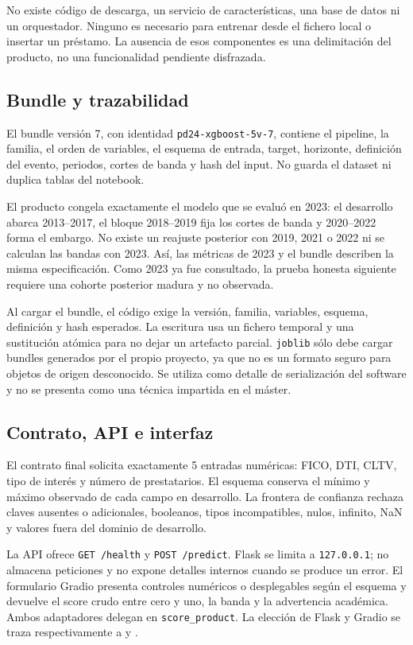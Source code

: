 \documentclass[10pt,a4paper]{article}
\newcommand{\SelectedK}{5}
\newcommand{\SelectedFeatures}{FICO, DTI, CLTV, tipo de interés y número de prestatarios}
\newcommand{\DevelopmentPeriod}{2013--2017}
\newcommand{\BandPeriod}{2018--2019}
\newcommand{\BundleVersion}{7}
\newcommand{\ModelVersion}{\texttt{pd24-xgboost-5v-7}}
\begin{document}
No existe código de descarga, un servicio de características, una base de datos
ni un orquestador. Ninguno es necesario para entrenar desde el fichero local o
insertar un préstamo. La ausencia de esos componentes es una delimitación del
producto, no una funcionalidad pendiente disfrazada.

\subsection{Bundle y trazabilidad}

El bundle versión \BundleVersion{}, con identidad \ModelVersion{}, contiene el pipeline, la
familia, el orden de variables, el esquema de entrada, target, horizonte,
definición del evento, periodos, cortes de banda y hash del input. No guarda el
dataset ni duplica tablas del notebook.

El producto congela exactamente el modelo que se evaluó en 2023: el desarrollo
abarca \DevelopmentPeriod{}, el bloque \BandPeriod{} fija los cortes de banda y
2020--2022 forma el embargo. No existe un reajuste posterior con 2019,
2021 o 2022 ni se calculan las bandas con 2023. Así, las métricas de 2023 y el
bundle describen la misma especificación. Como 2023 ya fue consultado, la prueba
honesta siguiente requiere una cohorte posterior madura y no observada.

Al cargar el bundle, el código exige la versión, familia, variables, esquema,
definición y hash esperados. La escritura usa un fichero temporal y una
sustitución atómica para no dejar un artefacto parcial. \texttt{joblib} sólo debe
cargar bundles generados por el propio proyecto, ya que no es un formato seguro
para objetos de origen desconocido. Se utiliza como detalle de serialización del
software y no se presenta como una técnica impartida en el máster.

\subsection{Contrato, API e interfaz}

El contrato final solicita exactamente \SelectedK{} entradas numéricas:
\SelectedFeatures{}. El esquema conserva el mínimo y máximo observado de cada
campo en desarrollo. La frontera de confianza rechaza claves
ausentes o adicionales, booleanos, tipos incompatibles, nulos, infinito, NaN y
valores fuera del dominio de desarrollo.

La API ofrece \texttt{GET /health} y \texttt{POST /predict}. Flask se limita a
\texttt{127.0.0.1}; no almacena peticiones y no expone detalles internos cuando
se produce un error. El formulario Gradio presenta controles numéricos o
desplegables según el esquema y devuelve el score crudo entre cero y uno, la
banda y la advertencia académica. Ambos adaptadores delegan en
\texttt{score\_product}. La elección de Flask y Gradio se traza respectivamente
a \cite[pp.~98, 103--108 y 114]{productivizacion} y
\cite[p.~17]{ml-semanas}.
\end{document}
